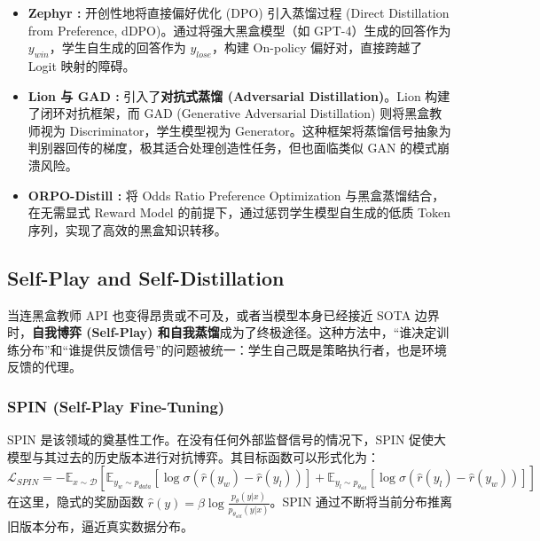 \begin{itemize}
    \item \textbf{Zephyr \cite{zephyr2023}:} 开创性地将直接偏好优化 (DPO) 引入蒸馏过程 (Direct Distillation from Preference, dDPO)。通过将强大黑盒模型（如 GPT-4）生成的回答作为 $y_{win}$，学生自生成的回答作为 $y_{lose}$，构建 On-policy 偏好对，直接跨越了 Logit 映射的障碍。
    \item \textbf{Lion 与 GAD \cite{lion2023, gad2025}:} 引入了\textbf{对抗式蒸馏 (Adversarial Distillation)}。Lion 构建了闭环对抗框架，而 GAD (Generative Adversarial Distillation) 则将黑盒教师视为 Discriminator，学生模型视为 Generator。这种框架将蒸馏信号抽象为判别器回传的梯度，极其适合处理创造性任务，但也面临类似 GAN 的模式崩溃风险。
    \item \textbf{ORPO-Distill \cite{orpo2025}:} 将 Odds Ratio Preference Optimization 与黑盒蒸馏结合，在无需显式 Reward Model 的前提下，通过惩罚学生模型自生成的低质 Token 序列，实现了高效的黑盒知识转移。
\end{itemize}

\subsection{Self-Play and Self-Distillation}
\label{subsec:self_play}

当连黑盒教师 API 也变得昂贵或不可及，或者当模型本身已经接近 SOTA 边界时，\textbf{自我博弈 (Self-Play) 和自我蒸馏}成为了终极途径。这种方法中，“谁决定训练分布”和“谁提供反馈信号”的问题被统一：学生自己既是策略执行者，也是环境反馈的代理。

\subsubsection{SPIN (Self-Play Fine-Tuning) \cite{spin2024}}
SPIN 是该领域的奠基性工作。在没有任何外部监督信号的情况下，SPIN 促使大模型与其过去的历史版本进行对抗博弈。其目标函数可以形式化为：
\begin{equation}
    \mathcal{L}_{SPIN} = -\mathbb{E}_{x \sim \mathcal{D}} \left[ \mathbb{E}_{y_w \sim p_{data}} [\log \sigma(\hat{r}(y_w) - \hat{r}(y_l))] + \mathbb{E}_{y_l \sim p_{\theta_{old}}} [\log \sigma(\hat{r}(y_l) - \hat{r}(y_w))] \right]
\end{equation}
在这里，隐式的奖励函数 $\hat{r}(y) = \beta \log \frac{p_\theta(y|x)}{p_{\theta_{old}}(y|x)}$。SPIN 通过不断将当前分布推离旧版本分布，逼近真实数据分布。


